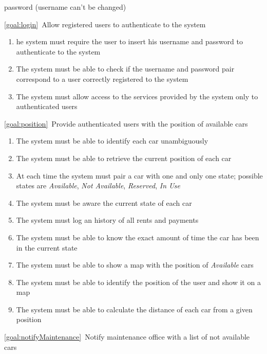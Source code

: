 \begin{description}
\begin{enumerate}[label=\textbf{R\arabic*}]
   				password (username can't be changed)
  			\end{enumerate}
		\item \ref{goal:login}\ Allow registered users to authenticate to the system
			\begin{enumerate}[resume*]
  				\item he system must require the user to insert his username and password to
  				authenticate to the system
   				\item The system must be able to check if the username and password pair
   				correspond to a user correctly registered to the system
   				\item The system must allow access to the services provided by the system only to
   				authenticated users 
			\end{enumerate}
		\item \ref{goal:position}\ Provide authenticated users with the position of available cars
			\begin{enumerate}[resume*]
				\item The system must be able to identify each car unambiguously
  				\item The system must be able to retrieve the current position of each car
  				\item At each time the system must pair a car with one and only one state; possible
  				states are \emph{Available}, \emph{Not Available}, \emph{Reserved}, \emph{In Use}
   				\item The system must be aware the current state of each car
   				\item The system must log an history of all rents and payments 
   				\item The system must be able to know the exact amount of time the car has been in
   				the current state
   				\item The system must be able to show a map with the position of \emph{Available}
   				cars
  				\item The system must be able to identify the position of the user and show it on a
  				map
   				\item The system must be able to calculate the distance of each car from a given
   				position
  			\end{enumerate}
		\item \ref{goal:notifyMaintenance}\ Notify maintenance office with a list of not available
		cars
			\begin{enumerate}[resume*]

\end{enumerate}
\end{description}
